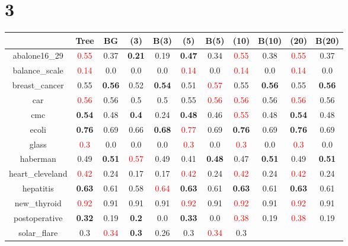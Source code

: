 \documentclass{article}%
\begin{document}
\section*{3}%
\begin{tabular}{c|cccccccccc}%
\hline%
&Tree&BG&(3)&B(3)&(5)&B(5)&(10)&B(10)&(20)&B(20)\\%
\hline%
abalone16\_29&\textcolor{red}{ 
0.55
}&0.37&\textbf{0.21}&0.19&\textbf{0.47}&0.34&\textcolor{red}{ 
0.55
}&0.38&\textcolor{red}{ 
0.55
}&0.37\\%
\hline%
balance\_scale&\textcolor{red}{ 
0.14
}&0.0&0.0&0.0&\textcolor{red}{ 
0.14
}&0.0&\textcolor{red}{ 
0.14
}&0.0&\textcolor{red}{ 
0.14
}&0.0\\%
\hline%
breast\_cancer&0.55&\textbf{0.56}&0.52&\textbf{0.54}&0.51&\textcolor{red}{ 
0.57
}&0.55&\textbf{0.56}&0.55&\textbf{0.56}\\%
\hline%
car&\textcolor{red}{ 
0.56
}&0.56&0.5&0.5&0.55&\textcolor{red}{ 
0.56
}&\textcolor{red}{ 
0.56
}&0.56&\textcolor{red}{ 
0.56
}&0.56\\%
\hline%
cmc&\textbf{0.54}&0.48&\textbf{0.4}&0.24&\textbf{0.48}&0.46&\textcolor{red}{ 
0.55
}&0.48&\textbf{0.54}&0.48\\%
\hline%
ecoli&\textbf{0.76}&0.69&0.66&\textbf{0.68}&\textcolor{red}{ 
0.77
}&0.69&\textbf{0.76}&0.69&\textbf{0.76}&0.69\\%
\hline%
glass&\textcolor{red}{ 
0.3
}&0.0&0.0&0.0&\textcolor{red}{ 
0.3
}&0.0&\textcolor{red}{ 
0.3
}&0.0&\textcolor{red}{ 
0.3
}&0.0\\%
\hline%
haberman&0.49&\textbf{0.51}&\textcolor{red}{ 
0.57
}&0.49&0.41&\textbf{0.48}&0.47&\textbf{0.51}&0.49&\textbf{0.51}\\%
\hline%
heart\_cleveland&\textcolor{red}{ 
0.42
}&0.24&0.17&0.17&\textcolor{red}{ 
0.42
}&0.24&\textcolor{red}{ 
0.42
}&0.24&\textcolor{red}{ 
0.42
}&0.24\\%
\hline%
hepatitis&\textbf{0.63}&0.61&0.58&\textcolor{red}{ 
0.64
}&\textbf{0.63}&0.61&\textbf{0.63}&0.61&\textbf{0.63}&0.61\\%
\hline%
new\_thyroid&\textcolor{red}{ 
0.92
}&0.91&0.91&0.91&\textcolor{red}{ 
0.92
}&0.91&\textcolor{red}{ 
0.92
}&0.91&\textcolor{red}{ 
0.92
}&0.91\\%
\hline%
postoperative&\textbf{0.32}&0.19&\textbf{0.2}&0.0&\textbf{0.33}&0.0&\textcolor{red}{ 
0.38
}&0.19&\textcolor{red}{ 
0.38
}&0.19\\%
\hline%
solar\_flare&0.3&\textcolor{red}{ 
0.34
}&\textbf{0.3}&0.26&0.3&\textcolor{red}{ 
0.34
}&0.3&\textcolor{red}{ 
}
\end{tabular}
\end{document}
